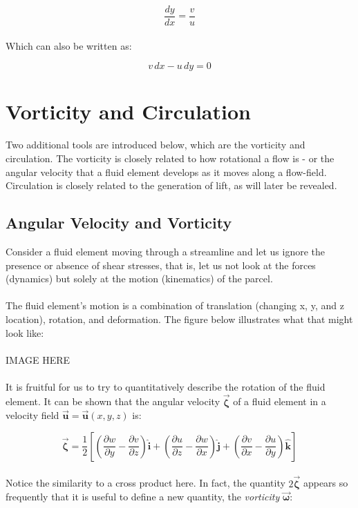 \documentclass[11pt]{article}
\begin{document}
\begin{equation*}
    \frac{dy}{dx} = \frac{v}{u}
\end{equation*} \\
\noindent
Which can also be written as:

\begin{equation*}
    v\,dx - u\,dy = 0
\end{equation*}
\pagebreak

\section{Vorticity and Circulation}
Two additional tools are introduced below, which are the vorticity and circulation. The vorticity is closely related to how rotational a flow is - or the angular velocity that a fluid element develops as it moves along a flow-field. Circulation is closely related to the generation of lift, as will later be revealed.

\subsection{Angular Velocity and Vorticity}
Consider a fluid element moving through a streamline and let us ignore the presence or absence of shear stresses, that is, let us not look at the forces (dynamics) but solely at the motion (kinematics) of the parcel. \\ \\
\noindent
The fluid element's motion is a combination of translation (changing x, y, and z location), rotation, and deformation. The figure below illustrates what that might look like: \\ \\ 

IMAGE HERE \\ \\ 
\noindent
It is fruitful for us to try to quantitatively describe the rotation of the fluid element. It can be shown that the angular velocity $\vec{\bm{\zeta}}$ of a fluid element in a velocity field $\vec{\bm{u}} = \vec{\bm{u}}(x, y, z)$ is:

\begin{equation*}
    \vec{\bm{\zeta}} = \frac{1}{2}\left[\left(\frac{\partial w}{\partial y} - \frac{\partial v}{\partial z}\right)\hat{\bm{i}} + \left(\frac{\partial u}{\partial z} - \frac{\partial w}{\partial x}\right)\hat{\bm{j}}+\left(\frac{\partial v}{\partial x} - \frac{\partial u}{\partial y}\right)\hat{\bm{k}}\right]
\end{equation*}\\
\noindent
Notice the similarity to a cross product here. In fact, the quantity $2\vec{\bm{\zeta}}$ appears so frequently that it is useful to define a new quantity, the \emph{vorticity} $\vec{\bm{\omega}}$:
\end{document}
